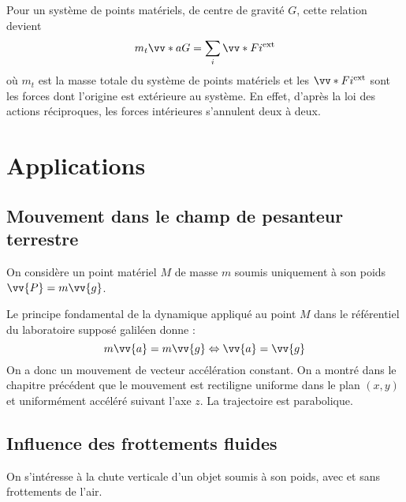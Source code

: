 \documentclass{cours}
\begin{document}
Pour un système de points matériels, de centre de gravité $G$, cette relation devient 
\begin{equation}
m_t \vv*{a}{G} = \sum_i \vv*{F}{i}^\text{ext}
\end{equation}
où $m_t$ est la masse totale du système de points matériels et les $\vv*{F}{i}^\text{ext}$ sont les forces dont l'origine est extérieure au système. En effet, d'après la loi des actions réciproques, les forces intérieures s'annulent deux à deux. 

\section{Applications}%
\label{sec:applications}

\subsection{Mouvement dans le champ de pesanteur terrestre}%
\label{sub:mouvement_dans_le_champ_de_pesanteur_terrestre}
On considère un point matériel $M$ de masse $m$ soumis uniquement à son poids $\vv{P} = m\vv{g}$.

\begin{center}
\end{center}

Le principe fondamental de la dynamique appliqué au point $M$ dans le référentiel du laboratoire supposé galiléen donne :
\begin{equation}
m \vv{a} = m \vv{g} \Leftrightarrow \vv{a} = \vv{g}
\end{equation}
On a donc un mouvement de vecteur accélération constant. On a montré dans le chapitre précédent que le mouvement est rectiligne uniforme dans le plan $(x, y)$ et uniformément accéléré suivant l'axe $z$. La trajectoire est parabolique.

\subsection{Influence des frottements fluides}%
\label{sub:influence_des_frottements_fluides}
On s'intéresse à la chute verticale d'un objet soumis à son poids, avec et sans frottements de l'air. 
\end{document}
